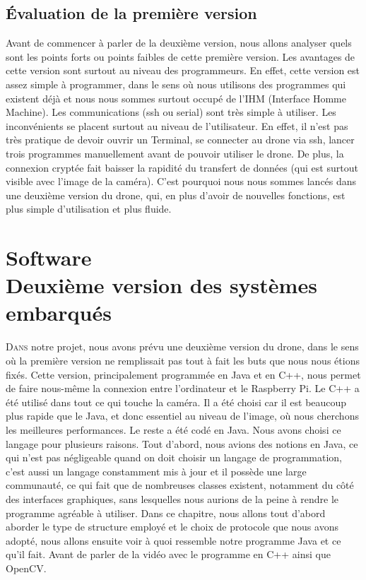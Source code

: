 \documentclass[a4paper,11pt]{report}
\begin{document}
{\begin{enumerate}
\begin{enumerate}
\section{Évaluation de la première version}

Avant de commencer à parler de la deuxième version, nous allons analyser quels sont les points forts ou points faibles de cette première version. Les avantages de cette version sont surtout au niveau des programmeurs. En effet, cette version est assez simple à programmer, dans le sens où nous utilisons des programmes qui existent déjà et nous nous sommes surtout occupé de l'IHM (Interface Homme Machine). Les communications (ssh ou serial) sont très simple à utiliser. Les inconvénients se placent surtout au niveau de l'utilisateur. En effet, il n'est pas très pratique de devoir ouvrir un Terminal, se connecter au drone via ssh, lancer trois programmes manuellement avant de pouvoir utiliser le drone. De plus, la connexion cryptée fait baisser la rapidité du transfert de données (qui est surtout visible avec l'image de la caméra). C'est pourquoi nous nous sommes lancés dans une deuxième version du drone, qui, en plus d'avoir de nouvelles fonctions, est plus simple d'utilisation et plus fluide. 

\clearpage

\chapter{Software \\ Deuxième version des systèmes embarqués}

\lettrine{D}{ans} notre projet, nous avons prévu une deuxième version du drone, 
dans le sens où la première version ne remplissait pas tout à fait les buts que nous 
nous étions fixés. Cette version, principalement programmée en Java et en C++, 
nous permet de faire nous-même la connexion entre l'ordinateur et le Raspberry Pi. Le C++ a été utilisé dans tout ce qui touche la caméra. Il a été choisi car il est beaucoup plus rapide que le Java, et donc essentiel au niveau de l'image, où nous cherchons les meilleures performances. Le reste a été codé en Java. Nous avons choisi ce langage pour plusieurs raisons. Tout d'abord, nous avions des notions en Java, 
ce qui n'est pas négligeable quand on doit choisir un langage de programmation, c'est aussi un langage constamment mis à jour et il possède une large communauté, ce qui fait que de nombreuses classes existent, notamment du côté des interfaces graphiques,
sans lesquelles nous aurions de la peine à rendre le programme agréable à utiliser. Dans ce chapitre, nous allons tout d'abord aborder le type de structure employé et le choix de protocole
que nous avons adopté, nous allons ensuite voir à quoi ressemble notre programme Java et ce qu'il fait. Avant de parler
de la vidéo avec le programme en C++ ainsi que OpenCV.


\end{enumerate}
\end{enumerate}}
\end{document}
